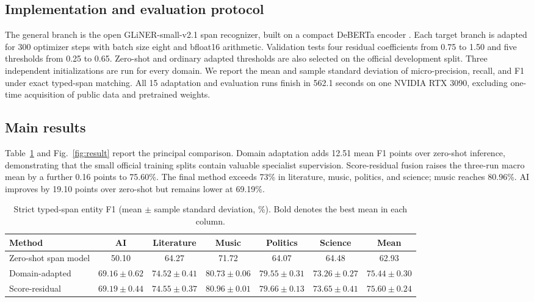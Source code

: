 \documentclass[a4paper,fleqn,numbers,doubleblind]{cas-dc}
\begin{document}
\subsection{Implementation and evaluation protocol}
The general branch is the open GLiNER-small-v2.1 span recognizer, built on a compact DeBERTa encoder \citep{zaratiana2024gliner}. Each target branch is adapted for 300 optimizer steps with batch size eight and bfloat16 arithmetic. Validation tests four residual coefficients from 0.75 to 1.50 and five thresholds from 0.25 to 0.65. Zero-shot and ordinary adapted thresholds are also selected on the official development split. Three independent initializations are run for every domain. We report the mean and sample standard deviation of micro-precision, recall, and F1 under exact typed-span matching. All 15 adaptation and evaluation runs finish in 562.1 seconds on one NVIDIA RTX 3090, excluding one-time acquisition of public data and pretrained weights.

\subsection{Main results}
Table~\ref{tab:results} and Fig.~\ref{fig:result} report the principal comparison. Domain adaptation adds 12.51 mean F1 points over zero-shot inference, demonstrating that the small official training splits contain valuable specialist supervision. Score-residual fusion raises the three-run macro mean by a further 0.16 points to 75.60\%. The final method exceeds 73\% in literature, music, politics, and science; music reaches 80.96\%. AI improves by 19.10 points over zero-shot but remains lower at 69.19\%.

\begin{table}[t]
\centering
\caption{Strict typed-span entity F1 (mean $\pm$ sample standard deviation, \%). Bold denotes the best mean in each column.}
\label{tab:results}
\begin{tabular}{lcccccc}
\toprule
Method & AI & Literature & Music & Politics & Science & Mean\\
\midrule
Zero-shot span model & 50.10 & 64.27 & 71.72 & 64.07 & 64.48 & 62.93\\
Domain-adapted & $69.16\pm0.62$ & $74.52\pm0.41$ & $80.73\pm0.06$ & $79.55\pm0.31$ & $73.26\pm0.27$ & $75.44\pm0.30$\\
Score-residual & $\mathbf{69.19\pm0.44}$ & $\mathbf{74.55\pm0.37}$ & $\mathbf{80.96\pm0.01}$ & $\mathbf{79.66\pm0.13}$ & $\mathbf{73.65\pm0.41}$ & $\mathbf{75.60\pm0.24}$\\
\bottomrule
\end{tabular}
\end{table}
\end{document}
